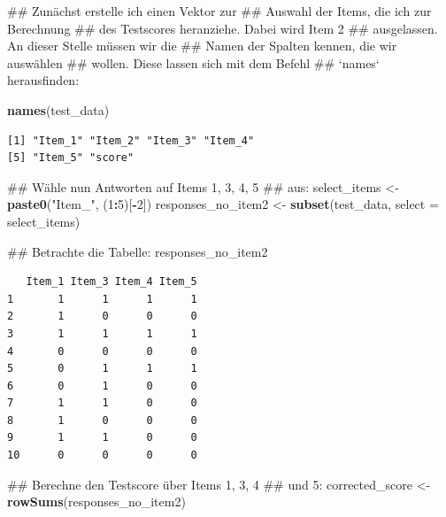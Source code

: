 \documentclass[12pt,]{tufte-book}
\newenvironment{Shaded}{\begin{snugshade}}{\end{snugshade}}
\newcommand{\KeywordTok}[1]{\textcolor[rgb]{0.13,0.29,0.53}{\textbf{#1}}}
\newcommand{\DataTypeTok}[1]{\textcolor[rgb]{0.13,0.29,0.53}{#1}}
\newcommand{\DecValTok}[1]{\textcolor[rgb]{0.00,0.00,0.81}{#1}}
\newcommand{\StringTok}[1]{\textcolor[rgb]{0.31,0.60,0.02}{#1}}
\newcommand{\OperatorTok}[1]{\textcolor[rgb]{0.81,0.36,0.00}{\textbf{#1}}}
\newcommand{\NormalTok}[1]{#1}
\theoremstyle{definition}
\theoremstyle{definition}
\theoremstyle{definition}
\theoremstyle{remark}
\begin{document}
\begin{Shaded}
\begin{Highlighting}[]
\NormalTok{## Zunächst erstelle ich einen Vektor zur}
\NormalTok{## Auswahl der Items, die ich zur Berechnung}
\NormalTok{## des Testscores heranziehe. Dabei wird Item 2}
\NormalTok{## ausgelassen. An dieser Stelle müssen wir die}
\NormalTok{## Namen der Spalten kennen, die wir auswählen}
\NormalTok{## wollen. Diese lassen sich mit dem Befehl}
\NormalTok{## `names` herausfinden:}

\KeywordTok{names}\NormalTok{(test_data)}
\end{Highlighting}
\end{Shaded}

\begin{verbatim}
[1] "Item_1" "Item_2" "Item_3" "Item_4"
[5] "Item_5" "score" 
\end{verbatim}

\begin{Shaded}
\begin{Highlighting}[]
\NormalTok{## Wähle nun Antworten auf Items 1, 3, 4, 5}
\NormalTok{## aus:}
\NormalTok{select_items <-}\StringTok{ }\KeywordTok{paste0}\NormalTok{(}\StringTok{"Item_"}\NormalTok{, (}\DecValTok{1}\OperatorTok{:}\DecValTok{5}\NormalTok{)[}\OperatorTok{-}\DecValTok{2}\NormalTok{])}
\NormalTok{responses_no_item2 <-}\StringTok{ }\KeywordTok{subset}\NormalTok{(test_data, }\DataTypeTok{select =}\NormalTok{ select_items)}

\NormalTok{## Betrachte die Tabelle:}
\NormalTok{responses_no_item2}
\end{Highlighting}
\end{Shaded}

\begin{verbatim}
   Item_1 Item_3 Item_4 Item_5
1       1      1      1      1
2       1      0      0      0
3       1      1      1      1
4       0      0      0      0
5       0      1      1      1
6       0      1      0      0
7       1      1      0      0
8       1      0      0      0
9       1      1      0      0
10      0      0      0      0
\end{verbatim}

\begin{Shaded}
\begin{Highlighting}[]
\NormalTok{## Berechne den Testscore über Items 1, 3, 4}
\NormalTok{## und 5:}
\NormalTok{corrected_score <-}\StringTok{ }\KeywordTok{rowSums}\NormalTok{(responses_no_item2)}
\end{Highlighting}
\end{Shaded}
\end{document}
